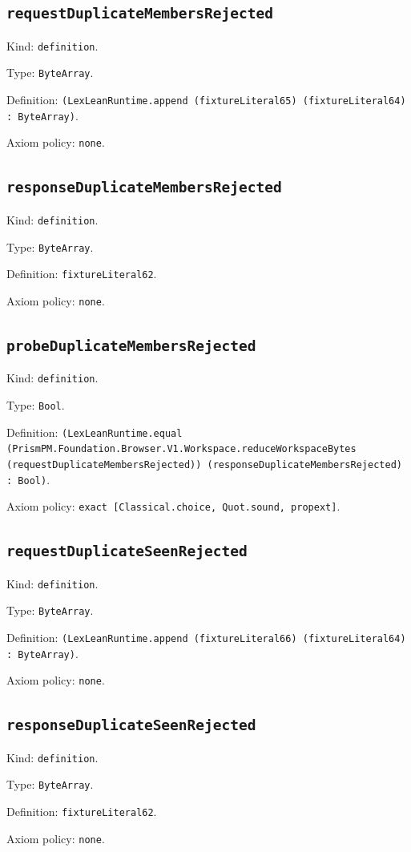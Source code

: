 \documentclass[11pt]{article}
\begin{document}
\subsection*{\texttt{requestDuplicateMembersRejected}}
\noindent Kind: \texttt{definition}.\par
\noindent Type: \texttt{ByteArray}.\par
\noindent Definition: \texttt{(LexLeanRuntime.append (fixtureLiteral65) (fixtureLiteral64) : ByteArray)}.\par
\noindent Axiom policy: \texttt{none}.\par
\subsection*{\texttt{responseDuplicateMembersRejected}}
\noindent Kind: \texttt{definition}.\par
\noindent Type: \texttt{ByteArray}.\par
\noindent Definition: \texttt{fixtureLiteral62}.\par
\noindent Axiom policy: \texttt{none}.\par
\subsection*{\texttt{probeDuplicateMembersRejected}}
\noindent Kind: \texttt{definition}.\par
\noindent Type: \texttt{Bool}.\par
\noindent Definition: \texttt{(LexLeanRuntime.equal (PrismPM.Foundation.Browser.V1.Workspace.reduceWorkspaceBytes (requestDuplicateMembersRejected)) (responseDuplicateMembersRejected) : Bool)}.\par
\noindent Axiom policy: \texttt{exact [Classical.choice, Quot.sound, propext]}.\par
\subsection*{\texttt{requestDuplicateSeenRejected}}
\noindent Kind: \texttt{definition}.\par
\noindent Type: \texttt{ByteArray}.\par
\noindent Definition: \texttt{(LexLeanRuntime.append (fixtureLiteral66) (fixtureLiteral64) : ByteArray)}.\par
\noindent Axiom policy: \texttt{none}.\par
\subsection*{\texttt{responseDuplicateSeenRejected}}
\noindent Kind: \texttt{definition}.\par
\noindent Type: \texttt{ByteArray}.\par
\noindent Definition: \texttt{fixtureLiteral62}.\par
\noindent Axiom policy: \texttt{none}.\par
\end{document}
